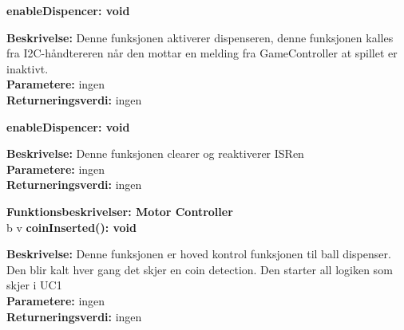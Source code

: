 \documentclass[Arkitektur/System_main.tex]{subfiles}
\begin{document}
\textbf {enableDispencer: void}
\begin{adjustwidth}{1cm}{0pt}
\textbf {Beskrivelse:} Denne funksjonen aktiverer dispenseren, denne funksjonen kalles fra I2C-håndtereren når den mottar en melding fra GameController at spillet er inaktivt. \\ [0.2cm]
\textbf {Parametere:} ingen \\ [0.2cm]
\textbf {Returneringsverdi:} ingen \\ [0.2cm]
\end{adjustwidth}


\textbf {enableDispencer: void}
\begin{adjustwidth}{1cm}{0pt}
\textbf {Beskrivelse:} Denne funksjonen clearer og reaktiverer ISRen \\ [0.2cm]
\textbf {Parametere:} ingen \\ [0.2cm]
\textbf {Returneringsverdi:} ingen \\ [0.2cm]
\end{adjustwidth}


{\large\textbf{Funktionsbeskrivelser: Motor Controller}}\\[0.2cm]
b v
\textbf {coinInserted(): void}
\begin{adjustwidth}{1cm}{0pt}
\textbf {Beskrivelse:} Denne funksjonen er hoved kontrol funksjonen til ball dispenser. Den blir kalt hver gang det skjer en coin detection. Den starter all logiken som skjer i UC1 \\ [0.2cm]
\textbf {Parametere:} ingen \\ [0.2cm]
\textbf {Returneringsverdi:} ingen \\ [0.2cm]
\end{adjustwidth}
\end{document}
